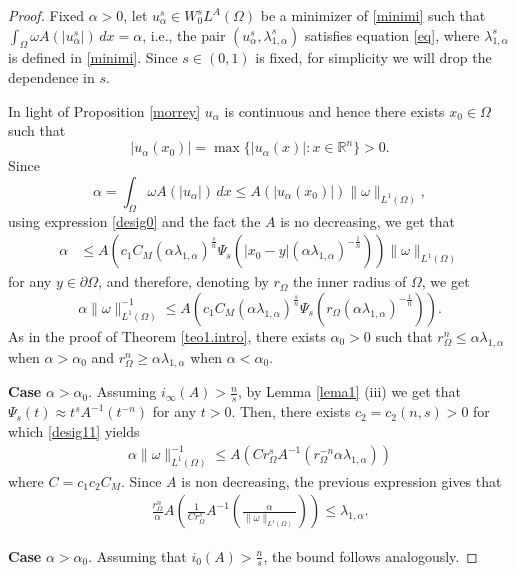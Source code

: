 \documentclass[10pt,a4paper]{amsart}
\begin{document}
\begin{proof}
Fixed $\alpha>0$, let $u_\alpha^s \in W^s_0 L^A(\Omega)$ be a minimizer of \eqref{minimi} such that $\int_\Omega \omega A(|u_\alpha^s|)\,dx =\alpha$, i.e., the pair $(u_\alpha^s, \lambda_{1,\alpha}^s)$ satisfies equation \eqref{eq}, where  $\lambda_{1,\alpha}^s$ is defined in \eqref{minimi}. Since $s\in(0,1)$ is fixed, for simplicity we will drop the dependence in $s$.

\noindent In light of Proposition \ref{morrey}  $u_\alpha$ is  continuous and hence there exists $x_0\in \Omega$ such that
$$
|u_\alpha(x_0)|=\max\{|u_\alpha(x)|\colon x \in \mathbb{R}^n\}>0.
$$
Since
$$
\alpha = \int_\Omega \omega A(|u_\alpha|)\,dx \leq A(|u_\alpha(x_0)|) \|\omega\|_{L^1(\Omega)},
$$
using expression \eqref{desig0} and the fact the $A$ is no decreasing,  we get that
\begin{align*}
\alpha &\leq
A\left( c_1  C_M \left(\alpha \lambda_{1,\alpha}  \right)^{\frac{s}{n}}\Psi_s \left( |x_0-y| \left( \alpha \lambda_{1,\alpha}   \right)^{-\frac{1}{n}}\right) \right) \|\omega\|_{L^1(\Omega)}
\end{align*}
for any $y\in \partial\Omega$, and therefore,  denoting by $r_\Omega$ the inner radius of $\Omega$, we get
\begin{equation} \label{desig11}
\alpha \|\omega\|_{L^1(\Omega)}^{-1}  
\leq
A\left( c_1  C_M \left(\alpha \lambda_{1,\alpha} \right)^{\frac{s}{n}}\Psi_s \left( r_\Omega \left( \alpha \lambda_{1,\alpha}   \right)^{-\frac{1}{n}}\right) \right).
\end{equation}
As in the proof of Theorem \ref{teo1.intro},  there exists $\alpha_0>0$ such that  $r_\Omega^n  \leq \alpha \lambda_{1,\alpha}$ when $\alpha>\alpha_0$ and $r_\Omega^n \geq \alpha \lambda_{1,\alpha}$ when $\alpha<\alpha_0$.

\medskip

{\bf Case }$\alpha>\alpha_0$. Assuming  $i_\infty(A) >\frac{n}{s}$, by  Lemma \ref{lema1} (iii) we get that $\Psi_s(t) \approx t^s A^{-1} (t^{-n})$ for any $t>0$. Then, there exists $c_2=c_2(n,s)>0$ for which  \eqref{desig11} yields
\begin{align*}
\alpha \|\omega\|_{L^1(\Omega)}^{-1}\leq 
A\left( C r_\Omega^s A^{-1} \left(   r_\Omega^{-n}\alpha \lambda_{1,\alpha} \right) \right)
\end{align*}
where $C=c_1c_2C_M$. Since $A$ is non decreasing, the previous expression gives that 
\begin{align*}
\frac{r_\Omega^n}{\alpha} A\left( \frac{1}{C r_\Omega ^s}A^{-1}\left( \frac{\alpha}{ \|\omega\|_{L^1(\Omega)}} \right) \right)
\leq 
    \lambda_{1,\alpha}.
\end{align*} 

{\bf Case }$\alpha>\alpha_0$. Assuming that $i_0(A) >\frac{n}{s}$, the bound follows analogously.
\end{proof}
\end{document}
